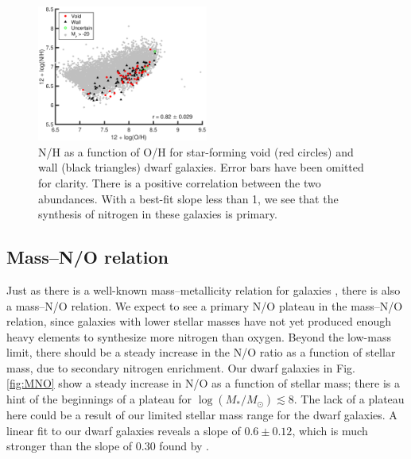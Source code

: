 \begin{figure}
    \centering
    \includegraphics[width=0.5\textwidth]{Images/Paper2/1sig_I06_dwarf_0-20_SF_t3_Z12logOH_N12logNH}
    \caption[N/H versus metallicity for 135 dwarf galaxy sample]{N/H as a 
    function of O/H for star-forming void (red circles) and wall (black 
    triangles) dwarf galaxies.  Error bars have been omitted for clarity.  There 
    is a positive correlation between the two abundances.  With a best-fit slope 
    less than 1, we see that the synthesis of nitrogen in these galaxies is 
    primary.}
    \label{fig:OHvNH}
\end{figure}





\subsection{Mass--N/O relation}\label{sec:Mass_NO}

Just as there is a well-known mass--metallicity relation for galaxies 
\citep[where the metallicity increases with stellar mass; see, 
e.g.,][]{Tremonti04}, there is also a mass--N/O relation.  We expect to see a 
primary N/O plateau in the mass--N/O relation, since galaxies with lower stellar 
masses have not yet produced enough heavy elements to synthesize more nitrogen 
than oxygen.  Beyond the low-mass limit, there should be a steady increase in 
the N/O ratio as a function of stellar mass, due to secondary nitrogen 
enrichment.  Our dwarf galaxies in Fig. \ref{fig:MNO} show a steady increase in 
N/O as a function of stellar mass; there is a hint of the beginnings of a 
plateau for $\log(M_*/M_{\odot}) \lesssim 8$.  The lack of a plateau here could 
be a result of our limited stellar mass range for the dwarf galaxies.  A linear 
fit to our dwarf galaxies reveals a slope of $0.6\pm 0.12$, which is much 
stronger than the slope of $0.30$ found by \cite{Andrews13}.


